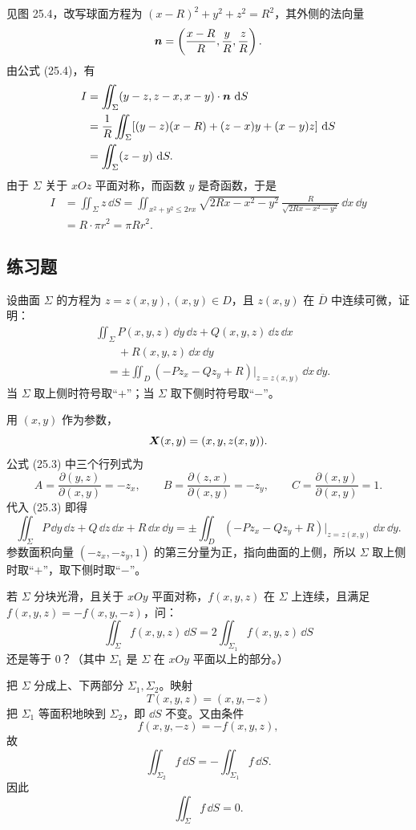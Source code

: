 \begin{xsolution}
见图 25.4，改写球面方程为 $(x-R)^2+y^2+z^2=R^2$，其外侧的法向量
\[
  \bm{n}=\left(\frac{x-R}{R},\frac yR,\frac zR\right).
\]
由公式 (25.4)，有
\begin{align*}
I&=\iint_\Sigma(y-z,z-x,x-y)\cdot\bm{n}\,\mathop{}\!\mathrm{d} S\\
&=\frac1R\iint_\Sigma[(y-z)(x-R)+(z-x)y+(x-y)z]\,\mathop{}\!\mathrm{d} S\\
&=\iint_\Sigma(z-y)\,\mathop{}\!\mathrm{d} S.
\end{align*}
由于 $\Sigma$ 关于 $xOz$ 平面对称，而函数 $y$ 是奇函数，于是
\begin{align*}
I&=\iint_\Sigma z\,\dd S
=\iint_{x^2+y^2\le2rx}\sqrt{2Rx-x^2-y^2}\,
\frac{R}{\sqrt{2Rx-x^2-y^2}}\,\dd x\,\dd y\\
&=R\cdot\pi r^2=\pi Rr^2.
\end{align*}
\end{xsolution}

\subsection{练习题}

\begin{xexercise}[1]
设曲面 $\Sigma$ 的方程为 $z=z(x,y),(x,y)\in D$，且 $z(x,y)$ 在 $\overline D$ 中连续可微，证明：
\[
\begin{aligned}
  &\iint_\Sigma P(x,y,z)\,\dd y\,\dd z
  +Q(x,y,z)\,\dd z\,\dd x\\
  &\qquad+R(x,y,z)\,\dd x\,\dd y\\
  &\quad=\pm\iint_D(-Pz_x-Qz_y+R)\big|_{z=z(x,y)}\,\dd x\,\dd y.
\end{aligned}
\]
当 $\Sigma$ 取上侧时符号取“$+$”；当 $\Sigma$ 取下侧时符号取“$-$”。
\end{xexercise}
\begin{xsolution}
用 $(x,y)$ 作为参数，
\[
  \bm{X}(x,y)=(x,y,z(x,y)).
\]
公式 (25.3) 中三个行列式为
\[
A=\frac{\partial(y,z)}{\partial(x,y)}=-z_x,
\qquad
B=\frac{\partial(z,x)}{\partial(x,y)}=-z_y,
\qquad
C=\frac{\partial(x,y)}{\partial(x,y)}=1.
\]
代入 (25.3) 即得
\[
  \iint_\Sigma P\,\dd y\,\dd z+Q\,\dd z\,\dd x+R\,\dd x\,\dd y
  =\pm\iint_D(-Pz_x-Qz_y+R)\big|_{z=z(x,y)}\,\dd x\,\dd y.
\]
参数面积向量 $(-z_x,-z_y,1)$ 的第三分量为正，指向曲面的上侧，所以 $\Sigma$ 取上侧时取“$+$”，取下侧时取“$-$”。
\end{xsolution}


\begin{xexercise}[2]
若 $\Sigma$ 分块光滑，且关于 $xOy$ 平面对称，$f(x,y,z)$ 在 $\Sigma$ 上连续，且满足 $f(x,y,z)=-f(x,y,-z)$，问：
\[
  \iint_\Sigma f(x,y,z)\,\dd S=2\iint_{\Sigma_1}f(x,y,z)\,\dd S
\]
还是等于 $0$？（其中 $\Sigma_1$ 是 $\Sigma$ 在 $xOy$ 平面以上的部分。）
\end{xexercise}
\begin{xsolution}
把 $\Sigma$ 分成上、下两部分 $\Sigma_1,\Sigma_2$。映射
\[
  T(x,y,z)=(x,y,-z)
\]
把 $\Sigma_1$ 等面积地映到 $\Sigma_2$，即 $\dd S$ 不变。又由条件
\[
  f(x,y,-z)=-f(x,y,z),
\]
故
\[
  \iint_{\Sigma_2}f\,\dd S=-\iint_{\Sigma_1}f\,\dd S.
\]
因此
\[
  \boxed{\iint_\Sigma f\,\dd S=0}.
\]
\end{xsolution}


